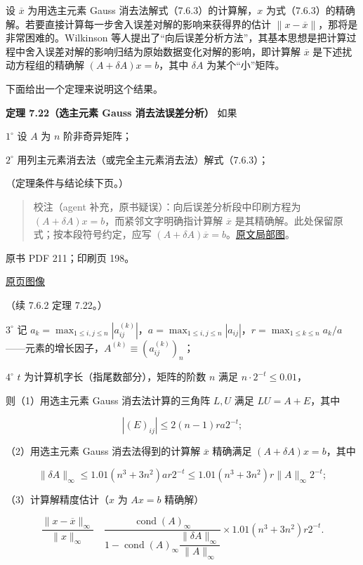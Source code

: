 \documentclass[
  10pt,
  fontset=fandol]{ctexart}
\begin{document}
设 \(\overline x\) 为用选主元素 Gauss 消去法解式（7.6.3）的计算解，\(x\)
为式（7.6.3）的精确解。若要直接计算每一步舍入误差对解的影响来获得界的估计
\(\|x-\overline x\|\)，那将是非常困难的。Wilkinson
等人提出了``向后误差分析方法''，其基本思想是把计算过程中舍入误差对解的影响归结为原始数据变化对解的影响，即计算解
\(\overline x\) 是下述扰动方程组的精确解 \((A+\delta A)x=b\)，其中
\(\delta A\) 为某个``小''矩阵。

下面给出一个定理来说明这个结果。

\textbf{定理 7.22（选主元素 Gauss 消去法误差分析）} 如果

\(1^\circ\) 设 \(A\) 为 \(n\) 阶非奇异矩阵；

\(2^\circ\) 用列主元素消去法（或完全主元素消去法）解式（7.6.3）；

（定理条件与结论续下页。）

\begin{quote}
校注（agent 补充，原书疑误）：向后误差分析段中印刷方程为
\((A+\delta A)x=b\)，而紧邻文字明确指计算解 \(\overline x\)
是其精确解。此处保留原式；按本段符号约定，应写
\((A+\delta A)\overline x=b\)。\href{../../../staging/ch07b/assets/210-backward-error.png}{原文局部图}。
\end{quote}

\clearpage

原书 PDF 211；印刷页 198。

\href{../../../source-images/pdf-211.jpeg}{原页图像}

（续 7.6.2 定理 7.22。）

\(3^\circ\) 记
\(a_k=\max_{1\leqslant i,j\leqslant n}|a_{ij}^{(k)}|\)，\(a=\max_{1\leqslant i,j\leqslant n}|a_{ij}|\)，\(r=\max_{1\leqslant k\leqslant n}a_k/a\)------元素的增长因子，\(A^{(k)}\equiv(a_{ij}^{(k)})_n\)；

\(4^\circ\) \(t\) 为计算机字长（指尾数部分），矩阵的阶数 \(n\) 满足
\(n\cdot2^{-t}\leqslant0.01\)，

则（1）用选主元素 Gauss 消去法计算的三角阵 \(L,U\) 满足 \(LU=A+E\)，其中

\[
|(E)_{ij}|\leqslant2(n-1)ra2^{-t};
\]

（2）用选主元素 Gauss 消去法得到的计算解 \(\overline x\) 精确满足
\((A+\delta A)x=b\)，其中

\[
\|\delta A\|_\infty\leqslant1.01(n^3+3n^2)ar2^{-t}\leqslant1.01(n^3+3n^2)r\|A\|_\infty2^{-t};
\]

（3）计算解精度估计（\(x\) 为 \(Ax=b\) 精确解）

\[
\frac{\|x-\overline x\|_\infty}{\|x\|_\infty}
\quad
\frac{\operatorname{cond}(A)_\infty}
{1-\operatorname{cond}(A)_\infty\dfrac{\|\delta A\|_\infty}{\|A\|_\infty}}
\times1.01(n^3+3n^2)r2^{-t}.
\tag{7.6.14}
\]
\end{document}
